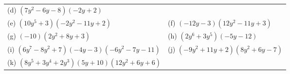 \begin{enumerate}[noitemsep, label=\textbf{\arabic*}. ]
{{\begin{center}
\begin{tabular}[t]{|l|l|}
        (d) $\left(7{y}^{2}-6y-8\right)\left(-2y+2\right)$%
     \tabularnewline\cline{1-1}\cline{2-2}
        (e) $\left(10{y}^{5}+3\right)\left(-2{y}^{2}-11y+2\right)$ &
        (f) $\left(-12y-3\right)\left(12{y}^{2}-11y+3\right)$%
     \tabularnewline\cline{1-1}\cline{2-2}
        (g) $\left(-10\right)\left(2{y}^{2}+8y+3\right)$ &
        (h) $\left(2{y}^{6}+3{y}^{5}\right)\left(-5y-12\right)$%
     \tabularnewline\cline{1-1}\cline{2-2}
        (i) $\left(6{y}^{7}-8{y}^{2}+7\right)\left(-4y-3\right)\left(-6{y}^{2}-7y-11\right)$ &
        (j) $\left(-9{y}^{2}+11y+2\right)\left(8{y}^{2}+6y-7\right)$%
     \tabularnewline\cline{1-1}\cline{2-2}
        (k) $\left(8{y}^{5}+3{y}^{4}+2{y}^{3}\right)\left(5y+10\right)\left(12{y}^{2}+6y+6\right)$ &

\end{tabular}
\end{center}}}
\end{enumerate}
